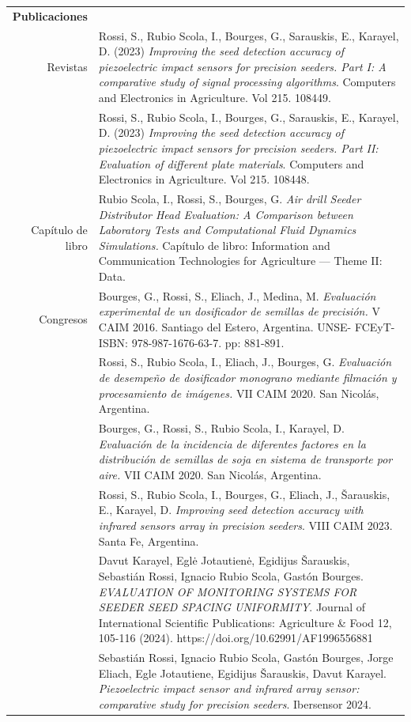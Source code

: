 \documentclass[a4paper,10pt, sans]{article}
\begin{document}
\begin{table}[H]
\begin{tabularx}{\textwidth}{r X}
    \textbf{Publicaciones } & {} \\ [1ex]
    {Revistas} & {Rossi, S., Rubio Scola, I., Bourges, G., Sarauskis, E., Karayel, D. (2023) \textit{Improving the seed detection accuracy of piezoelectric impact sensors for precision seeders. Part I: A comparative study of signal processing algorithms}. Computers and Electronics in Agriculture. Vol 215. 108449.} \\ [1ex]
      {} & {Rossi, S., Rubio Scola, I., Bourges, G., Sarauskis, E., Karayel, D. (2023) \textit{Improving the seed detection accuracy of piezoelectric impact sensors for precision seeders. Part II: Evaluation of different plate materials}. Computers and Electronics in Agriculture. Vol 215. 108448.} \\ [1ex]
    {Capítulo de libro} & Rubio Scola, I., Rossi, S., Bourges, G. \textit{Air drill Seeder Distributor Head Evaluation: A Comparison between Laboratory Tests and Computational Fluid Dynamics Simulations.} Capítulo de libro: Information and Communication Technologies for Agriculture — Theme II: Data. \\ [1ex]
    Congresos & Bourges, G., Rossi, S., Eliach, J., Medina, M. \textit{Evaluación experimental de un dosificador de semillas de precisión.} V CAIM 2016. Santiago del Estero, Argentina. UNSE- FCEyT- ISBN: 978-987-1676-63-7. pp: 881-891. \\  [1ex]
      {} & Rossi, S., Rubio Scola, I., Eliach, J., Bourges, G. \textit{Evaluación de desempeño de dosificador monograno mediante filmación y procesamiento de imágenes.} VII CAIM 2020. San Nicolás, Argentina. \\  [1ex]
      {} & Bourges, G., Rossi, S., Rubio Scola, I., Karayel, D. \textit{Evaluación de la incidencia de diferentes factores en la distribución de semillas de soja en sistema de transporte por aire.} VII CAIM 2020. San Nicolás, Argentina. \\  [1ex]
      {} & Rossi, S., Rubio Scola, I., Bourges, G., Eliach, J., Šarauskis, E., Karayel, D. \textit{Improving seed detection accuracy with infrared sensors array in precision seeders}. VIII CAIM 2023. Santa Fe, Argentina. \\  [1ex]
      {} & Davut Karayel, Eglė Jotautienė, Egidijus Šarauskis, Sebastián Rossi, Ignacio Rubio Scola, Gastón Bourges. \textit{EVALUATION OF MONITORING SYSTEMS FOR SEEDER SEED SPACING UNIFORMITY}. Journal of International Scientific Publications: Agriculture \& Food 12, 105-116 (2024). https://doi.org/10.62991/AF1996556881  \\  [1ex]
      {} & Sebastián Rossi, Ignacio Rubio Scola, Gastón Bourges, Jorge Eliach, Egle Jotautiene,
Egidijus Šarauskis, Davut Karayel. \textit{Piezoelectric impact sensor and infrared array sensor:
comparative study for precision seeders}. Ibersensor 2024. \\ 
    

  \end{tabularx}
  \end{table}
\end{document}
